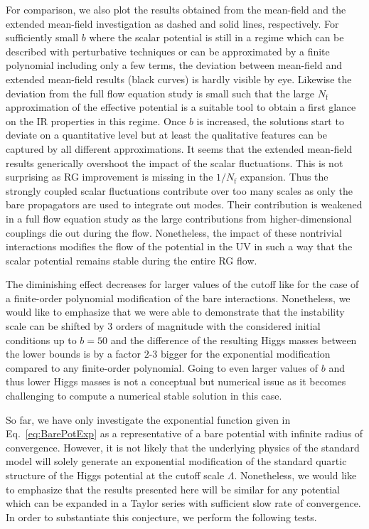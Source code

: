 \documentclass[twocolumn,aps,prd,showpacs,nofootinbib,superscriptaddress,preprintnumbers,floatfix,10pt]{revtex4-1}
\newcommand{\Nf}{N_{\mathrm{f}}}
\begin{document}
For comparison, we also plot the results obtained from the mean-field and the extended mean-field investigation as dashed and solid lines, respectively. For sufficiently small $b$ where the scalar potential is still in a regime which can be described with perturbative techniques or can be approximated by a finite polynomial including only a few terms, the deviation between mean-field and extended mean-field results (black curves) is hardly visible by eye. Likewise the deviation from the full flow equation study is small such that the large $\Nf$ approximation of the effective potential is a suitable tool to obtain a first glance on the IR properties in this regime. Once $b$ is increased, the solutions start to deviate on a quantitative level but at least the qualitative features can be captured by all different approximations. It seems that the extended mean-field results generically overshoot the impact of the scalar fluctuations. This is not surprising as RG improvement is missing in the $1/\Nf$ expansion. Thus the strongly coupled scalar fluctuations contribute over too many scales as only the bare propagators are used to integrate out modes. Their contribution is weakened in a full flow equation study as the large contributions from higher-dimensional couplings die out during the flow. Nonetheless, the impact of these nontrivial interactions modifies the flow of the potential in the UV in such a way that the scalar potential remains stable during the entire RG flow. 

The diminishing effect decreases for larger values of the cutoff like for the case of a finite-order polynomial modification of the bare interactions. 
Nonetheless, we would like to emphasize that we were able to demonstrate that the instability scale can be shifted by 3 orders of magnitude with the considered initial conditions up to $b=50$ and the difference of the resulting Higgs masses between the lower bounds is by a factor $2$-$3$ bigger for the exponential modification compared to any finite-order polynomial.
Going to even larger values of $b$ and thus lower Higgs masses is not a conceptual but numerical issue as it becomes challenging to compute a numerical stable solution in this case. 



So far, we have only investigate the exponential function given in Eq.~\eqref{eq:BarePotExp} as a representative of a bare potential with infinite radius of convergence. 
However, it is not likely that the underlying physics of the standard model will solely generate an exponential modification of the standard quartic structure of the Higgs potential at the cutoff scale $\Lambda$. 
Nonetheless, we would like to emphasize that the results presented here will be similar for any potential which can be expanded in a Taylor series with sufficient slow rate of convergence.
In order to substantiate this conjecture, we perform the following tests.
\end{document}
